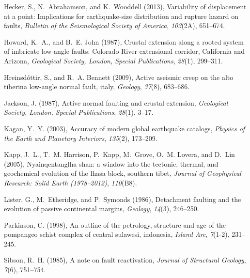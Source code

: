 \documentclass[twocolumn,grl]{AGUTeX}
\begin{document}
\begin{article}
\begin{thebibliography}{29}
Hecker, S., N.~Abrahamson, and K.~Wooddell (2013), Variability of displacement
  at a point: Implications for earthquake-size distribution and rupture hazard
  on faults, \textit{Bulletin of the Seismological Society of America},
  \textit{103}(2A), 651--674.

Howard, K.~A., and B.~E. John (1987), Crustal extension along a rooted system
  of imbricate low-angle faults: {Colorado River} extensional corridor,
  {California} and {Arizona}, \textit{Geological Society, London, Special
  Publications}, \textit{28}(1), 299--311.

Hreinsd{\'o}ttir, S., and R.~A. Bennett (2009), Active aseismic creep on the
  alto tiberina low-angle normal fault, italy, \textit{Geology},
  \textit{37}(8), 683--686.

Jackson, J. (1987), Active normal faulting and crustal extension,
  \textit{Geological Society, London, Special Publications}, \textit{28}(1),
  3--17.

Kagan, Y.~Y. (2003), Accuracy of modern global earthquake catalogs,
  \textit{Physics of the Earth and Planetary Interiors}, \textit{135}(2),
  173--209.

Kapp, J.~L., T.~M. Harrison, P.~Kapp, M.~Grove, O.~M. Lovera, and D.~Lin
  (2005), Nyainqentanglha shan: a window into the tectonic, thermal, and
  geochemical evolution of the lhasa block, southern tibet, \textit{Journal of
  Geophysical Research: Solid Earth (1978--2012)}, \textit{110}(B8).

Lister, G., M.~Etheridge, and P.~Symonds (1986), Detachment faulting and the
  evolution of passive continental margins, \textit{Geology}, \textit{14}(3),
  246--250.

Parkinson, C. (1998), An outline of the petrology, structure and age of the
  pompangeo schist complex of central sulawesi, indonesia, \textit{Island Arc},
  \textit{7}(1-2), 231--245.

Sibson, R.~H. (1985), A note on fault reactivation, \textit{Journal of
  Structural Geology}, \textit{7}(6), 751--754.


\end{thebibliography}
\end{article}
\end{document}
